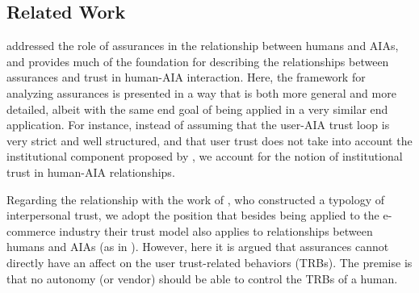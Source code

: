 \subsection{Related Work}\label{sec:rel_work}
    \citet{Lillard2016-yg} addressed the role of assurances in the relationship between humans and AIAs, and provides much of the foundation for describing the relationships between assurances and trust in human-AIA interaction. Here, the framework for analyzing assurances is presented in a way that is both more general and more detailed, albeit with the same end goal of being applied in a very similar end application. For instance, instead of assuming that the user-AIA trust loop is very strict and well structured, and that user trust does not take into account the institutional component proposed by \citet{McKnight2001-fa}, we account for the notion of institutional trust in  human-AIA relationships.

Regarding the relationship with the work of \citet{McKnight2001-fa}, who constructed a typology of interpersonal trust,  we adopt the position that besides being applied to the e-commerce industry their trust model also applies to relationships between humans and AIAs (as in \citet{Lillard2016-yg}). However, here it is argued that assurances cannot directly have an affect on the user trust-related behaviors (TRBs). The premise is that no autonomy (or vendor) should be able to control the TRBs of a human. 





